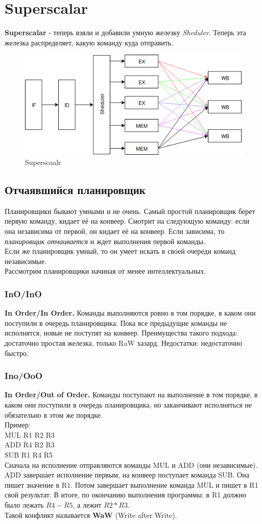 \documentclass[12pt, a4paper]{article}
\begin{document}
\section{Superscalar}
\textbf{Superscalar} - теперь взяли и добавили умную железку \textit{Sheduler}. Теперь эта железка распределяет, какую команду куда отправить.
\begin{figure}
    \centering
    \includegraphics[width=0.8\linewidth]{images/Superscalar.png}
    \caption{Superscaalr}
    \label{fig:Superscalar}
\end{figure}
\subsection{Отчаявшийся планировщик}
Планировщики бывают умными и не очень. Самый простой планировщик берет первую команду, кидает её на конвеер. Смотрит на следующую команду: если она независима от первой, он кидает её на конвеер. Если зависима, то \textit{планировщик отчаивается} и ждет выполнения первой команды.\\
Если же планировщик умный, то он умеет искать в своей очереди команд независимые.\\
Рассмотрим планировщики начиная от менее интеллектуальных.
\subsubsection{InO/InO}
\textbf{In Order/In Order.} Команды выполняются ровно в том порядке, в каком они поступили в очередь планировщика. Пока все предыдущие команды не исполнятся, новые не поступят на конвеер. Преимущества такого подхода: достаточно простая железка, только RaW хазард. Недостатки: недостаточно быстро.
\subsubsection{Ino/OoO}
\textbf{In Order/Out of Order.} Команды поступают на выполнение в том порядке, в каком они поступили в очередь планировщика, но заканчивают исполняться не обязательно в этом же порядке.\\
Пример:\\
MUL R1 R2 R3\\
ADD R4 R2 R3\\
SUB R1 R4 R5\\
Сначала на исполнение отправляются команды MUL и ADD (они независимые). ADD завершает исполнение первым, на конвеер поступает команда SUB. Она пишет значение в R1. Потом завершает выполнение команда MUL и пишет в R1 свой результат. В итоге, по окончанию выполнения программы: в R1 должно было лежать $R4 - R5$, а лежит $R2 * R3$.\\
Такой конфликт называется \textbf{WaW} (Write after Write).
\end{document}

